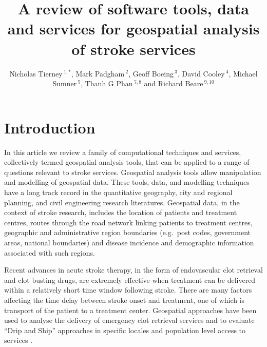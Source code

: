 \documentclass[utf8]{frontiersHLTH}
\def\firstAuthorLast{FirstAuthor {et~al.}} %
\def\Authors{Nicholas Tierney\,$^{1,*}$, Mark Padgham\,$^{2}$, Geoff Boeing\,$^{3}$, David Cooley\,$^{4}$, Michael Sumner\,$^{5}$, Thanh G Phan\,$^{7,8}$ and Richard Beare\,$^{9,10}$}
\begin{document}
\onecolumn
{}

\title[Software tools for geospatial analysis]{A review of software tools, data and services for geospatial analysis of stroke services}

\author[\firstAuthorLast ]{\Authors} %
\address{} %
\correspondance{} %

\extraAuth{}%

\maketitle

\section{Introduction}\label{introduction}

In this article we review a family of computational techniques and
services, collectively termed geospatial analysis tools, that can be
applied to a range of questions relevant to stroke services. Geospatial
analysis tools allow manipulation and modelling of geospatial data.
These tools, data, and modelling techniques have a long track record in
the quantitative geography, city and regional planning, and civil
engineering research literatures. Geospatial data, in the context of
stroke research, includes the location of patients and treatment
centres, routes through the road network linking patients to treatment
centres, geographic and administrative region boundaries (e.g.~post
codes, government areas, national boundaries) and disease incidence and
demographic information associated with such regions.

Recent advances in acute stroke therapy, in the form of endovascular
clot retrieval and clot busting drugs, are extremely effective when
treatment can be delivered within a relatively short time window
following stroke. There are many factors affecting the time delay
between stroke onset and treatment, one of which is transport of the
patient to a treatment center. Geospatial approaches have been used to
analyse the delivery of emergency clot retrieval services
\cite{Phan_2017} and to evaluate ``Drip and Ship'' approaches in
specific locales \cite{Milne_2017} and population level
access to services \cite{Adeoye_2014}.
\end{document}
